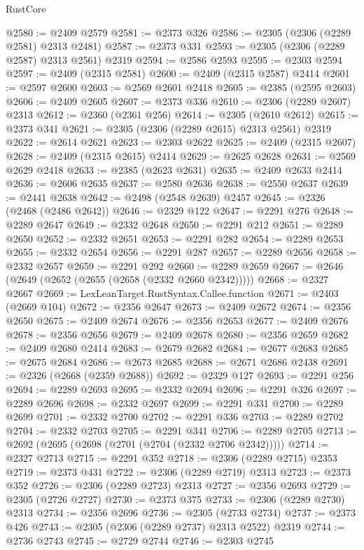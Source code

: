 \begin{lexlean}{RustCore}
\begin{coremodule}
@2580 := @2409 @2579
@2581 := @2373 @326
@2586 := @2305 (@2306 (@2289 @2581) @2313 @2481)
@2587 := @2373 @331
@2593 := @2305 (@2306 (@2289 @2587) @2313 @2561) @2319
@2594 := @2586 @2593
@2595 := @2303 @2594
@2597 := @2409 (@2315 @2581)
@2600 := @2409 (@2315 @2587) @2414
@2601 := @2597 @2600
@2603 := @2569 @2601 @2418
@2605 := @2385 (@2595 @2603)
@2606 := @2409 @2605
@2607 := @2373 @336
@2610 := @2306 (@2289 @2607) @2313
@2612 := @2360 (@2361 @256)
@2614 := @2305 (@2610 @2612)
@2615 := @2373 @341
@2621 := @2305 (@2306 (@2289 @2615) @2313 @2561) @2319
@2622 := @2614 @2621
@2623 := @2303 @2622
@2625 := @2409 (@2315 @2607)
@2628 := @2409 (@2315 @2615) @2414
@2629 := @2625 @2628
@2631 := @2569 @2629 @2418
@2633 := @2385 (@2623 @2631)
@2635 := @2409 @2633 @2414
@2636 := @2606 @2635
@2637 := @2580 @2636
@2638 := @2550 @2637
@2639 := @2441 @2638
@2642 := @2498 (@2548 @2639) @2457
@2645 := @2326 (@2468 (@2486 @2642))
@2646 := @2329 @122
@2647 := @2291 @276
@2648 := @2289 @2647
@2649 := @2332 @2648
@2650 := @2291 @212
@2651 := @2289 @2650
@2652 := @2332 @2651
@2653 := @2291 @282
@2654 := @2289 @2653
@2655 := @2332 @2654
@2656 := @2291 @287
@2657 := @2289 @2656
@2658 := @2332 @2657
@2659 := @2291 @292
@2660 := @2289 @2659
@2667 := @2646 (@2649 (@2652 (@2655 (@2658 (@2332 @2660 @2342)))))
@2668 := @2327 @2667
@2669 := LexLeanTarget.RustSyntax.Callee.function
@2671 := @2403 (@2669 @104)
@2672 := @2356 @2647
@2673 := @2409 @2672
@2674 := @2356 @2650
@2675 := @2409 @2674
@2676 := @2356 @2653
@2677 := @2409 @2676
@2678 := @2356 @2656
@2679 := @2409 @2678
@2680 := @2356 @2659
@2682 := @2409 @2680 @2414
@2683 := @2679 @2682
@2684 := @2677 @2683
@2685 := @2675 @2684
@2686 := @2673 @2685
@2688 := @2671 @2686 @2438
@2691 := @2326 (@2668 (@2359 @2688))
@2692 := @2329 @127
@2693 := @2291 @256
@2694 := @2289 @2693
@2695 := @2332 @2694
@2696 := @2291 @326
@2697 := @2289 @2696
@2698 := @2332 @2697
@2699 := @2291 @331
@2700 := @2289 @2699
@2701 := @2332 @2700
@2702 := @2291 @336
@2703 := @2289 @2702
@2704 := @2332 @2703
@2705 := @2291 @341
@2706 := @2289 @2705
@2713 := @2692 (@2695 (@2698 (@2701 (@2704 (@2332 @2706 @2342)))))
@2714 := @2327 @2713
@2715 := @2291 @352
@2718 := @2306 (@2289 @2715) @2353
@2719 := @2373 @431
@2722 := @2306 (@2289 @2719) @2313
@2723 := @2373 @352
@2726 := @2306 (@2289 @2723) @2313
@2727 := @2356 @2693
@2729 := @2305 (@2726 @2727)
@2730 := @2373 @375
@2733 := @2306 (@2289 @2730) @2313
@2734 := @2356 @2696
@2736 := @2305 (@2733 @2734)
@2737 := @2373 @426
@2743 := @2305 (@2306 (@2289 @2737) @2313 @2522) @2319
@2744 := @2736 @2743
@2745 := @2729 @2744
@2746 := @2303 @2745

\end{coremodule}
\end{lexlean}
